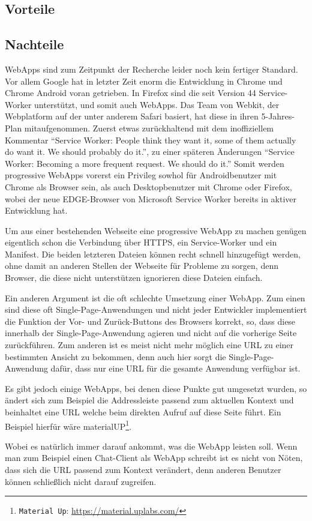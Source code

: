 \documentclass[a4paper,12pt,ngerman,listof=numbered]{scrartcl}      %
\let\oldcite\cite
\renewcommand{\cite}[1]{\textsuperscript{\oldcite{#1}}}
\providecommand{\inlinecode}[1]{\texttt{#1}}
\begin{document}
	\subsection{Vorteile}
	\subsection{Nachteile}
	WebApps sind zum Zeitpunkt der Recherche leider noch kein fertiger Standard. Vor allem Google hat in letzter Zeit enorm die Entwicklung in Chrome und Chrome Android voran getrieben. In Firefox sind die seit Version 44 Service-Worker unterstützt, und somit auch WebApps.\cite{swReady} Das Team von Webkit, der Webplatform auf der unter anderem Safari basiert, hat diese in ihren 5-Jahres-Plan mitaufgenommen. Zuerst etwas zurückhaltend mit dem inoffiziellem Kommentar ``Service Worker: People think they want it, some of them actually do want it. We should probably do it.''\cite{webkitServiceWorkerTwitter}, zu einer späteren Änderungen ``Service Worker: Becoming a more frequent request. We should do it.''\cite{webkitServiceWorker5yPlan} Somit werden progressive WebApps vorerst ein Privileg sowhol für Androidbenutzer mit Chrome als Browser sein, als auch Desktopbenutzer mit Chrome oder Firefox, wobei der neue EDGE-Browser von Microsoft Service Worker bereits in aktiver Entwicklung hat.\cite{telerikWebApp}\par
	Um aus einer bestehenden Webseite eine progressive WebApp zu machen ge\-nü\-gen eigentlich schon die Verbindung über HTTPS, ein Service-Worker und ein Manifest. Die beiden letzteren Dateien können recht schnell hinzugefügt werden, ohne damit an anderen Stellen der Webseite für Probleme zu sorgen, denn Browser, die diese nicht unterstützen ignorieren diese Dateien einfach.\par
	Ein anderen Argument ist die oft schlechte Umsetzung einer WebApp. Zum einen sind diese oft Single-Page-Anwendungen und nicht jeder Entwickler implementiert die Funktion der Vor- und Zurück-Buttons des Browsers korrekt, so, dass diese innerhalb der Single-Page-Anwendung agieren und nicht auf die vorherige Seite zurückführen. Zum anderen ist es meist nicht mehr möglich eine URL zu einer bestimmten Ansicht zu bekommen, denn auch hier sorgt die Single-Page-Anwendung dafür, dass nur eine URL für die gesamte Anwendung verfügbar ist.\par
	Es gibt jedoch einige WebApps, bei denen diese Punkte gut umgesetzt wurden, so ändert sich zum Beispiel die Addressleiste passend zum aktuellen Kontext und beinhaltet eine URL welche beim direkten Aufruf auf diese Seite führt. Ein Beispiel hierfür wäre materialUP\footnote{\inlinecode{Material Up}: \url{https://material.uplabs.com/}}.\par
	Wobei es natürlich immer darauf ankommt, was die WebApp leisten soll. Wenn man zum Beispiel einen Chat-Client als WebApp schreibt ist es nicht von Nöten, dass sich die URL passend zum Kontext verändert, denn anderen Benutzer können schließlich nicht darauf zugreifen.\par
\end{document}

